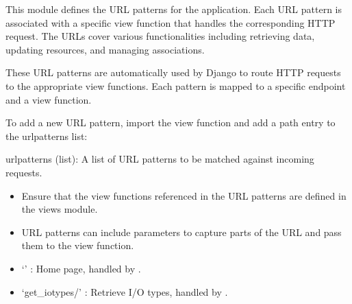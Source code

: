 \documentclass[letterpaper,10pt,english]{sphinxmanual}
\begin{document}
\sphinxAtStartPar
This module defines the URL patterns for the application. Each URL pattern is associated 
with a specific view function that handles the corresponding HTTP request. The URLs cover 
various functionalities including retrieving data, updating resources, and managing associations.
\begin{description}
\sphinxAtStartPar
These URL patterns are automatically used by Django to route HTTP requests to the appropriate 
view functions. Each pattern is mapped to a specific endpoint and a view function.

\sphinxAtStartPar
To add a new URL pattern, import the view function and add a path entry to the urlpatterns list:

\begin{sphinxVerbatim}[commandchars=\\\{\}]
   
  
\end{sphinxVerbatim}

\sphinxAtStartPar
urlpatterns (list): A list of URL patterns to be matched against incoming requests.

\begin{itemize}
\item {} 
\sphinxAtStartPar
Ensure that the view functions referenced in the URL patterns are defined in the views module.

\item {} 
\sphinxAtStartPar
URL patterns can include parameters to capture parts of the URL and pass them to the view function.

\end{itemize}

\begin{itemize}
\item {} 
\sphinxAtStartPar
‘’ : Home page, handled by .

\item {} 
\sphinxAtStartPar
‘get\_iotypes/’ : Retrieve I/O types, handled by .


\end{itemize}
\end{description}
\end{document}
